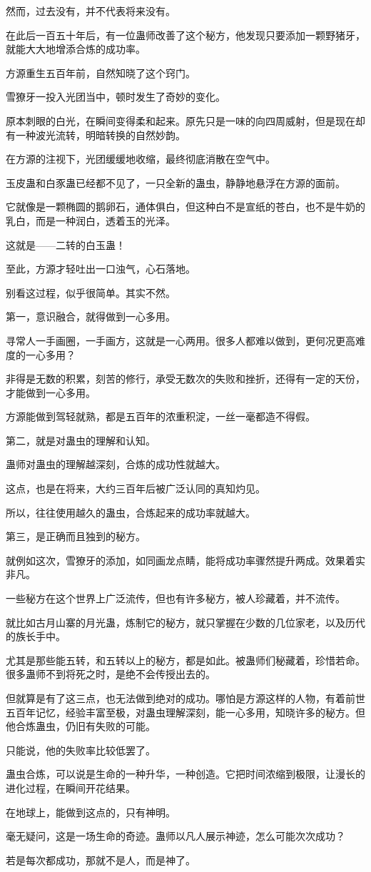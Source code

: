 \begin{this_body}
然而，过去没有，并不代表将来没有。

在此后一百五十年后，有一位蛊师改善了这个秘方，他发现只要添加一颗野猪牙，就能大大地增添合炼的成功率。

方源重生五百年前，自然知晓了这个窍门。

雪獠牙一投入光团当中，顿时发生了奇妙的变化。

原本刺眼的白光，在瞬间变得柔和起来。原先只是一味的向四周威射，但是现在却有一种波光流转，明暗转换的自然妙韵。

在方源的注视下，光团缓缓地收缩，最终彻底消散在空气中。

玉皮蛊和白豕蛊已经都不见了，一只全新的蛊虫，静静地悬浮在方源的面前。

它就像是一颗椭圆的鹅卵石，通体俱白，但这种白不是宣纸的苍白，也不是牛奶的乳白，而是一种润白，透着玉的光泽。

这就是——二转的白玉蛊！

至此，方源才轻吐出一口浊气，心石落地。

别看这过程，似乎很简单。其实不然。

第一，意识融合，就得做到一心多用。

寻常人一手画圈，一手画方，这就是一心两用。很多人都难以做到，更何况更高难度的一心多用？

非得是无数的积累，刻苦的修行，承受无数次的失败和挫折，还得有一定的天份，才能做到一心多用。

方源能做到驾轻就熟，都是五百年的浓重积淀，一丝一毫都造不得假。

第二，就是对蛊虫的理解和认知。

蛊师对蛊虫的理解越深刻，合炼的成功性就越大。

这点，也是在将来，大约三百年后被广泛认同的真知灼见。

所以，往往使用越久的蛊虫，合炼起来的成功率就越大。

第三，是正确而且独到的秘方。

就例如这次，雪獠牙的添加，如同画龙点睛，能将成功率骤然提升两成。效果着实非凡。

一些秘方在这个世界上广泛流传，但也有许多秘方，被人珍藏着，并不流传。

就比如古月山寨的月光蛊，炼制它的秘方，就只掌握在少数的几位家老，以及历代的族长手中。

尤其是那些能五转，和五转以上的秘方，都是如此。被蛊师们秘藏着，珍惜若命。很多蛊师不到将死之时，是绝不会传授出去的。

但就算是有了这三点，也无法做到绝对的成功。哪怕是方源这样的人物，有着前世五百年记忆，经验丰富至极，对蛊虫理解深刻，能一心多用，知晓许多的秘方。但他合炼蛊虫，仍旧有失败的可能。

只能说，他的失败率比较低罢了。

蛊虫合炼，可以说是生命的一种升华，一种创造。它把时间浓缩到极限，让漫长的进化过程，在瞬间开花结果。

在地球上，能做到这点的，只有神明。

毫无疑问，这是一场生命的奇迹。蛊师以凡人展示神迹，怎么可能次次成功？

若是每次都成功，那就不是人，而是神了。

\end{this_body}
